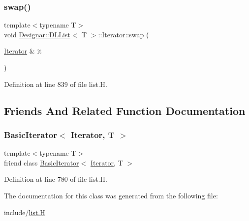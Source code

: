 \mbox{\label{class_designar_1_1_d_l_list_1_1_iterator_afb6abdec64f67b81813441a4c7d133d1}} 
\subsubsection{\texorpdfstring{swap()}{swap()}}
{\footnotesize\ttfamily template$<$typename T$>$ \\
void \hyperlink{class_designar_1_1_d_l_list}{Designar\+::\+D\+L\+List}$<$ T $>$\+::Iterator\+::swap (\begin{DoxyParamCaption}\item[{\hyperlink{class_designar_1_1_d_l_list_1_1_iterator}{Iterator} \&}]{it }\end{DoxyParamCaption})\hspace{0.3cm}{\ttfamily [inline]}}



Definition at line 839 of file list.\+H.



\subsection{Friends And Related Function Documentation}
\mbox{\label{class_designar_1_1_d_l_list_1_1_iterator_ae3421d6be56b523bf3c41ceb29f3e5d7}} 
\subsubsection{\texorpdfstring{Basic\+Iterator$<$ Iterator, T $>$}{BasicIterator< Iterator, T >}}
{\footnotesize\ttfamily template$<$typename T$>$ \\
friend class \hyperlink{class_designar_1_1_basic_iterator}{Basic\+Iterator}$<$ \hyperlink{class_designar_1_1_d_l_list_1_1_iterator}{Iterator}, T $>$\hspace{0.3cm}{\ttfamily [friend]}}



Definition at line 780 of file list.\+H.



The documentation for this class was generated from the following file\+:\begin{DoxyCompactItemize}
\item 
include/\hyperlink{list_8_h}{list.\+H}\end{DoxyCompactItemize}
